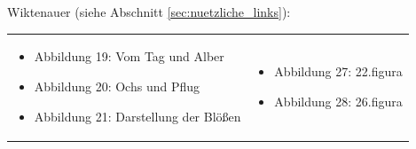 Wiktenauer (siehe Abschnitt \ref{sec:nuetzliche_links}):

\begin{longtable}{p{6.25cm}p{6.25cm}}
\begin{itemize}
    \item Abbildung 19: Vom Tag und Alber
    \item Abbildung 20: Ochs und Pflug
    \item Abbildung 21: Darstellung der Blößen
\end{itemize}

&

\begin{itemize}
    \item Abbildung 27: 22.figura
    \item Abbildung 28: 26.figura
\end{itemize}
\end{longtable}


